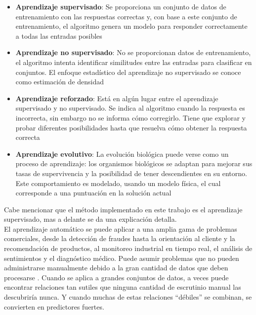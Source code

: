 \begin{itemize}

	\item \textbf{Aprendizaje supervisado}: Se proporciona un conjunto de datos de entrenamiento con las respuestas correctas y, con base a este conjunto de 
	entrenamiento, el algoritmo genera un modelo para responder correctamente a todas 
	las entradas posibles

	\item \textbf{Aprendizaje no supervisado}: No se proporcionan datos de entrenamiento, el algoritmo intenta identificar similitudes entre las entradas para clasificar en conjuntos. El enfoque estadístico del aprendizaje no 
	supervisado se conoce como estimación de densidad

	\item \textbf{Aprendizaje reforzado}: Está en algún lugar entre el aprendizaje supervisado y no supervisado. Se indica al algoritmo cuando la respuesta es incorrecta, sin embargo no se informa
	cómo corregirlo. Tiene que explorar y probar diferentes posibilidades hasta que resuelva 
	cómo obtener la respuesta correcta

	\item \textbf{Aprendizaje evolutivo}: La evolución biológica puede verse como un proceso de aprendizaje: los organismos biológicos se adaptan para mejorar sus tasas de supervivencia 
	y la posibilidad de tener descendientes en su entorno. Este comportamiento es modelado, 
	usando un modelo física, el cual corresponde a una puntuación en la 
	solución actual

\end{itemize}

Cabe mencionar que el método implementado en este trabajo es el aprendizaje supervisado, mas a delante se da una explicación detalla.\\

El aprendizaje automático se puede aplicar a una amplia gama de problemas comerciales, desde la detección de fraudes hasta la orientación al cliente y la recomendación de productos, al monitoreo industrial en tiempo real, el análisis de sentimientos y el diagnóstico médico. Puede asumir problemas que no pueden administrarse manualmente debido a la gran cantidad de datos que deben procesarse \citep{CT22}. Cuando se aplica a grandes conjuntos de datos, a veces puede encontrar relaciones tan sutiles que ninguna cantidad de escrutinio manual las descubriría nunca. Y cuando muchas de estas relaciones ``débiles'' se combinan, se convierten en predictores fuertes.





